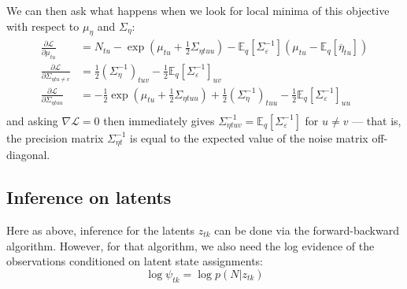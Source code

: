 \documentclass[11pt]{article}
\begin{document}
We can then ask what happens when we look for local minima of this objective with respect to $\mu_\eta$ and $\Sigma_\eta$:
\begin{align}
    \frac{\partial \mathcal{L}}{\partial \mu_{tu}} &=
    N_{tu} - \exp\left(\mu_{tu} + \frac{1}{2} \Sigma_{\eta tuu} \right)
    - \mathbb{E}_q[\Sigma_\varepsilon^{-1}](\mu_{tu} - \mathbb{E}_q[\overline{\eta}_{tu}]) \\
    \frac{\partial \mathcal{L}}{\partial \Sigma_{\eta tu \neq v}} &=
    \frac{1}{2} \left(\Sigma^{-1}_\eta \right)_{tuv}
    -\frac{1}{2}\mathbb{E}_q[\Sigma_\varepsilon^{-1}]_{uv}\\
    \frac{\partial \mathcal{L}}{\partial \Sigma_{\eta tuu}} &=
    -\frac{1}{2} \exp\left(\mu_{tu} + \frac{1}{2} \Sigma_{\eta tuu} \right)
    + \frac{1}{2} \left(\Sigma^{-1}_\eta \right)_{tuu}
    -\frac{1}{2}\mathbb{E}_q[\Sigma_\varepsilon^{-1}]_{uu} \\
\end{align}
and asking $\nabla \mathcal{L} = 0$ then immediately gives $\Sigma^{-1}_{\eta tuv} = \mathbb{E}_q[\Sigma_\varepsilon^{-1}]$ for $u\neq v$ --- that is, the precision matrix $\Sigma^{-1}_{\eta t}$ is equal to the expected value of the noise matrix off-diagonal.

\subsection{Inference on latents}
Here as above, inference for the latents $z_{tk}$ can be done via the forward-backward algorithm. However, for that algorithm, we also need the log evidence of the observations conditioned on latent state assignments:
\begin{equation}
    \log \psi_{tk} = \log p(N|z_{tk})
\end{equation}
\end{document}
